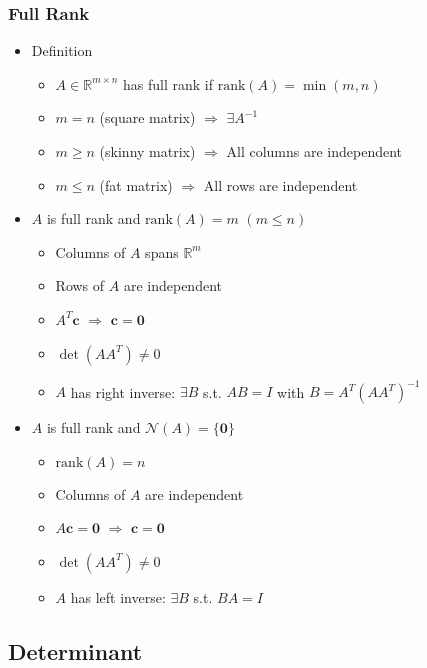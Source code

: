 \subsubsection*{Full Rank}
\begin{itemize}
    \item Definition
    \begin{itemize}
        \item $A \in \mathbb{R}^{m \times n}$ has full rank if $\mathrm{rank}(A) = \min (m, n)$
        \item $m = n$ (square matrix) $\Rightarrow$ $\exists A^{-1}$
        \item $m \geq n$ (skinny matrix) $\Rightarrow$ All columns are independent
        \item $m \leq n$ (fat matrix) $\Rightarrow$ All rows are independent
    \end{itemize}
    \item $A$ is full rank and $\mathrm{rank}(A) = m$ $(m \leq n)$
    \begin{itemize}
        \item Columns of $A$ spans $\mathbb{R}^m$
        \item Rows of $A$ are independent
        \item $A^T\mathbf{c}$ $\Rightarrow$ $\mathbf{c} = \mathbf{0}$
        \item $\det(AA^T) \neq 0$
        \item $A$ has right inverse: $\exists B$ s.t. $AB = I$ with $B = A^T(AA^T)^{-1}$
    \end{itemize}
    \item $A$ is full rank and $\mathcal{N}(A) = \{\mathbf{0}\}$
    \begin{itemize}
        \item $\mathrm{rank}(A) = n$
        \item Columns of $A$ are independent
        \item $A\mathbf{c} = \mathbf{0}$ $\Rightarrow$ $\mathbf{c} = \mathbf{0}$
        \item $\det(AA^T) \neq 0$
        \item $A$ has left inverse: $\exists B$ s.t. $BA = I$
    \end{itemize}
\end{itemize}

\subsection{Determinant}

